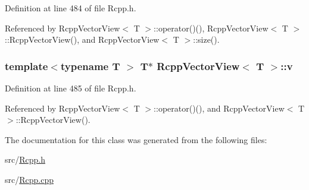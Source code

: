 Definition at line 484 of file Rcpp.h.

Referenced by RcppVectorView$<$ T $>$::operator()(), RcppVectorView$<$ T $>$::RcppVectorView(), and RcppVectorView$<$ T $>$::size().\hypertarget{classRcppVectorView_e3dc3546d0dd0e3de95800b7c91857e8}{
\subsubsection[{v}]{\setlength{\rightskip}{0pt plus 5cm}template$<$typename T $>$ T$\ast$ {\bf RcppVectorView}$<$ T $>$::{\bf v}}}
\label{classRcppVectorView_e3dc3546d0dd0e3de95800b7c91857e8}




Definition at line 485 of file Rcpp.h.

Referenced by RcppVectorView$<$ T $>$::operator()(), and RcppVectorView$<$ T $>$::RcppVectorView().

The documentation for this class was generated from the following files:\begin{CompactItemize}
\item 
src/\hyperlink{Rcpp_8h}{Rcpp.h}\item 
src/\hyperlink{Rcpp_8cpp}{Rcpp.cpp}\end{CompactItemize}
